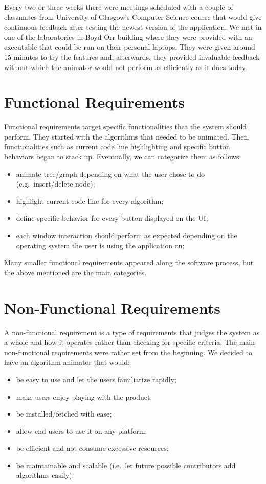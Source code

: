 \documentclass{l4proj}
\begin{document}
Every two or three weeks there were meetings scheduled with a couple of classmates from University of Glasgow's Computer Science course that would give continuous feedback after testing the newest version of the application. We met in one of the laboratories in Boyd Orr building where they were provided with an executable that could be run on their personal laptops. They were given around 15 minutes to try the features and, afterwards, they provided invaluable feedback without which the animator would not perform as efficiently as it does today.

\section{Functional Requirements}

Functional requirements target specific functionalities that the system should perform. They started with the algorithms that needed to be animated. Then, functionalities such as current code line highlighting and specific button behaviors began to stack up. Eventually, we can categorize them as follows:

\begin{itemize}
\item animate tree/graph depending on what the user chose to do (e.g.\ insert/delete node);
\item highlight current code line for every algorithm;
\item define specific behavior for every button displayed on the UI;
\item each window interaction should perform as expected depending on the operating system the user is using the
  application on;
\end{itemize}

Many smaller functional requirements appeared along the software process, but the above mentioned are the main categories.

\section{Non-Functional Requirements}

A non-functional requirement is a type of requirements that judges the system as a whole and how it operates rather than checking for specific criteria. The main non-functional requirements were rather set from the beginning. We decided to have an algorithm animator that would:

\begin{itemize}
\item be easy to use and let the users familiarize rapidly;
\item make users enjoy playing with the product;
\item be installed/fetched with ease;
\item allow end users to use it on any platform;
\item be efficient and not consume excessive resources;
\item be maintainable and scalable (i.e.\ let future possible contributors add algorithms easily).
\end{itemize}
\end{document}
